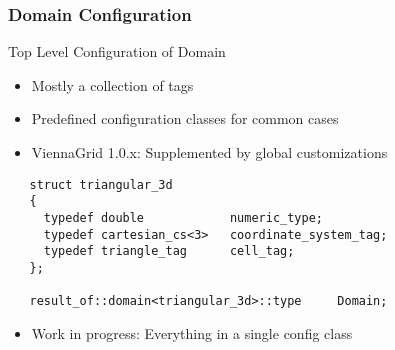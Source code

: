 

\begin{frame}[fragile]
\frametitle{Domain Configuration}
 \begin{block}{Top Level Configuration of Domain}
  \begin{itemize}
   \item Mostly a collection of tags
   \item Predefined configuration classes for common cases
   \item ViennaGrid 1.0.x: Supplemented by global customizations
  \end{itemize}

  \begin{lstlisting}
   struct triangular_3d
   {
     typedef double            numeric_type;
     typedef cartesian_cs<3>   coordinate_system_tag;
     typedef triangle_tag      cell_tag;
   };
   
   result_of::domain<triangular_3d>::type     Domain;
  \end{lstlisting} 

  \begin{itemize}
   \item Work in progress: Everything in a single config class
  \end{itemize}
 \end{block}
 \vspace*{0.45cm}
\end{frame}



